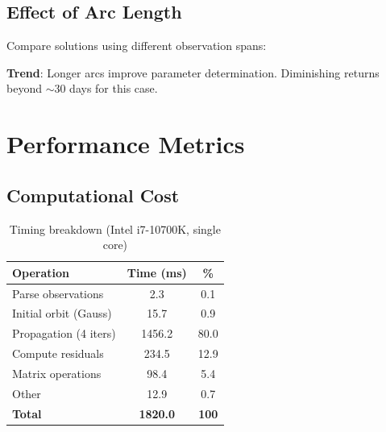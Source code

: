 \subsection{Effect of Arc Length}

Compare solutions using different observation spans:

\begin{table}[htbp]
\centering
\caption{Solution quality vs. arc length}
\end{table}

\textbf{Trend}: Longer arcs improve parameter determination. Diminishing returns beyond $\sim$30 days for this case.

\section{Performance Metrics}

\subsection{Computational Cost}

\begin{table}[htbp]
\centering
\small
\caption{Timing breakdown (Intel i7-10700K, single core)}
\begin{tabular}{lcc}
\toprule
\textbf{Operation} & \textbf{Time (ms)} & \textbf{\%} \\
\midrule
Parse observations & 2.3 & 0.1 \\
Initial orbit (Gauss) & 15.7 & 0.9 \\
Propagation (4 iters) & 1456.2 & 80.0 \\
Compute residuals & 234.5 & 12.9 \\
Matrix operations & 98.4 & 5.4 \\
Other & 12.9 & 0.7 \\
\midrule
\textbf{Total} & \textbf{1820.0} & \textbf{100} \\
\bottomrule
\end{tabular}
\end{table}

